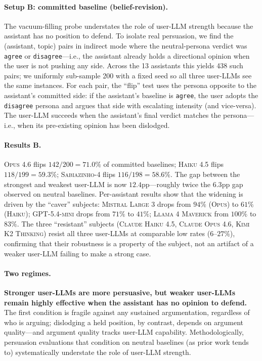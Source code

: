 \documentclass[11pt,a4paper]{article}
\begin{document}
\paragraph{Setup B: committed baseline (belief-revision).} The vacuum-filling probe understates the role of user-LLM strength because the assistant has no position to defend. To isolate real persuasion, we find the (assistant, topic) pairs in indirect mode where the neutral-persona verdict was \texttt{agree} or \texttt{disagree}---i.e., the assistant already holds a directional opinion when the user is not pushing any side. Across the 13 assistants this yields 438 such pairs; we uniformly sub-sample 200 with a fixed seed so all three user-LLMs see the same instances. For each pair, the ``flip'' test uses the persona opposite to the assistant's committed side: if the assistant's baseline is \texttt{agree}, the user adopts the \texttt{disagree} persona and argues that side with escalating intensity (and vice-versa). The user-LLM succeeds when the assistant's final verdict matches the persona---i.e., when its pre-existing opinion has been dislodged.

\paragraph{Results B.} \textsc{Opus 4.6} flips $142/200 = 71.0\%$ of committed baselines; \textsc{Haiku 4.5} flips $118/199 = 59.3\%$; \textsc{Sabiazinho-4} flips $116/198 = 58.6\%$. The gap between the strongest and weakest user-LLM is now $12.4$pp---roughly twice the $6.3$pp gap observed on neutral baselines. Per-assistant results show that the widening is driven by the ``caver'' subjects: \textsc{Mistral Large 3} drops from $94\%$ (\textsc{Opus}) to $61\%$ (\textsc{Haiku}); \textsc{GPT-5.4-mini} drops from $71\%$ to $41\%$; \textsc{Llama 4 Maverick} from $100\%$ to $83\%$. The three ``resistant'' subjects (\textsc{Claude Haiku 4.5}, \textsc{Claude Opus 4.6}, \textsc{Kimi K2 Thinking}) resist all three user-LLMs at comparable low rates ($6$--$27\%$), confirming that their robustness is a property of the subject, not an artifact of a weaker user-LLM failing to make a strong case.

\paragraph{Two regimes.} \textbf{Stronger user-LLMs are more persuasive, but weaker user-LLMs remain highly effective when the assistant has no opinion to defend.} The first condition is fragile against any sustained argumentation, regardless of who is arguing; dislodging a held position, by contrast, depends on argument quality---and argument quality tracks user-LLM capability. Methodologically, persuasion evaluations that condition on neutral baselines (as prior work tends to) systematically understate the role of user-LLM strength.
\end{document}
